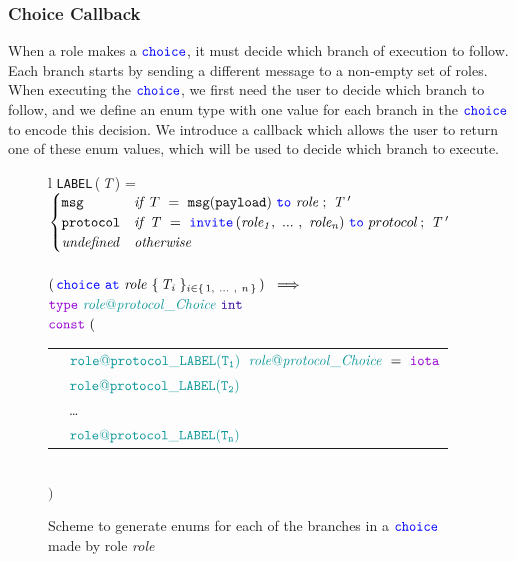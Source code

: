 \documentclass[12pt,twoside]{report}
\begin{document}
\subsubsection{Choice Callback}

When a role makes a ${\color{blue}\mathtt{choice}}$, it must decide which branch of execution to follow. Each branch starts by sending a different message to a non-empty set of roles. When executing the ${\color{blue}\mathtt{choice}}$, we first need the user to decide which branch to follow, and we define an enum type with one value for each branch in the ${\color{blue}\mathtt{choice}}$ to encode this decision. We introduce a callback which allows the user to return one of these enum values, which will be used to decide which branch to execute.

\begin{figure}[!h]
    \begin{center}
        \begin{tabular}{l}
            \texttt{LABEL}\,(\,\textit{T}\,) = \\[3pt]
            \begin{math}
                \begin{cases}
                    \varname{msg} & \mathit{if}\ T\ =\ \scrmessage{msg}{payload}\ \scrto\ \mathit{role}\;;\ \mathit{T\,'}\\
                    \varname{protocol} & \mathit{if}\ \mathit{T}\ =\ \invite\,(\roles{role}{n})\ \scrto\ protocol\,;\ \mathit{T\,'}\\
                    \mathit{undefined} & \mathit{otherwise}
                \end{cases}
            \end{math}\\\\[6pt]

            $(\,\choice\ \at\ \mathit{role}\ \{\,\mathit{T_i}\;\}_{\varinset{i}{\{\,1,\ \dots\ ,\ n\,\}}}\,)\ \implies$\\[10pt]
            
            $\gotype\ \enumtype{\localprotocol{role}{protocol}\_Choice}\ \typename{int}$\\[6pt]
            $\goconst\ ($\\[3pt]
            \begin{tabular}{ll}
                \indent & $\enumvalue{\localprotocol{role}{protocol}\_LABEL(T_1)}\;\ \enumtype{\localprotocol{role}{protocol}\_Choice}\ =\ \goiota$ \\
                \indent & $\enumvalue{\localprotocol{role}{protocol}\_LABEL(T_2)}$ \\
                \indent & \dots \\
                \indent & $\enumvalue{\localprotocol{role}{protocol}\_LABEL(T_n)}$ \\
            \end{tabular}\\[3pt]
            $)$
        \end{tabular}
    \end{center}
    
    \caption{Scheme to generate enums for each of the branches in a ${\color{blue}\mathtt{choice}}$ made by role \textit{role}}
    \label{choice-enum-gen}
\end{figure}
\end{document}
